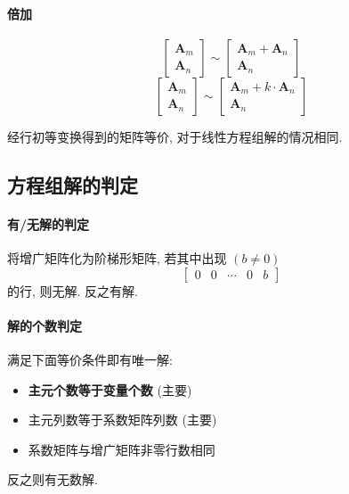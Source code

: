 \documentclass[UTF8]{ctexart}
\newcommand{\ve}[1]{\boldsymbol{\mathbf{#1}}}
\begin{document}
\paragraph{倍加}
\[
\begin{bmatrix}
\ve A_m \\
\ve A_n
\end{bmatrix}
\sim
\begin{bmatrix}
\ve A_m + \ve A_n \\
\ve A_n
\end{bmatrix}
\]
\[
\begin{bmatrix}
\ve A_m \\
\ve A_n
\end{bmatrix}
\sim
\begin{bmatrix}
\ve A_m + k \cdot \ve A_n \\
\ve A_n
\end{bmatrix}
\]

经行初等变换得到的矩阵等价, 对于线性方程组解的情况相同. 




\subsection{方程组解的判定}
\begin{framed}
    \vspace{-0.7em}
    \paragraph{有/无解的判定}
    将增广矩阵化为阶梯形矩阵, 若其中出现 $ (b \neq 0) $
    \[ \begin{bmatrix}
        0 & 0 & \cdots & 0 & b
    \end{bmatrix} \]
    的行, 则无解. 反之有解.
\end{framed}

\begin{framed}
    \vspace{-0.7em}
    \paragraph{解的个数判定}
    满足下面等价条件即有唯一解:
    \begin{itemize}
        \item \textbf{主元个数等于变量个数} (主要)
        \item 主元列数等于系数矩阵列数 (主要)
        \item 系数矩阵与增广矩阵非零行数相同
    \end{itemize}
    反之则有无数解.
\end{framed}
\end{document}
